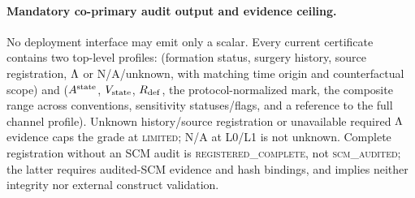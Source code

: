 \paragraph{Mandatory co-primary audit output and evidence ceiling.}
No deployment interface may emit only a scalar. Every current certificate
contains two top-level profiles: 
(formation status, surgery history, source registration, $\Lambda$ or
N/A/unknown, with matching time origin and counterfactual scope) and
 ($A^{\mathrm{state}}$, $V_{\mathrm{state}}$, $R_{\mathrm{def}}$, the
protocol-normalized mark, the composite range across conventions, sensitivity
statuses/flags, and a reference to the full channel profile). Unknown
history/source registration or unavailable required $\Lambda$ evidence caps the
grade at \textsc{limited}; N/A at L0/L1 is not unknown. Complete registration
without an SCM audit is \textsc{registered\_complete}, not
\textsc{scm\_audited}; the latter requires audited-SCM evidence and hash
bindings, and implies neither integrity nor external construct validation.

